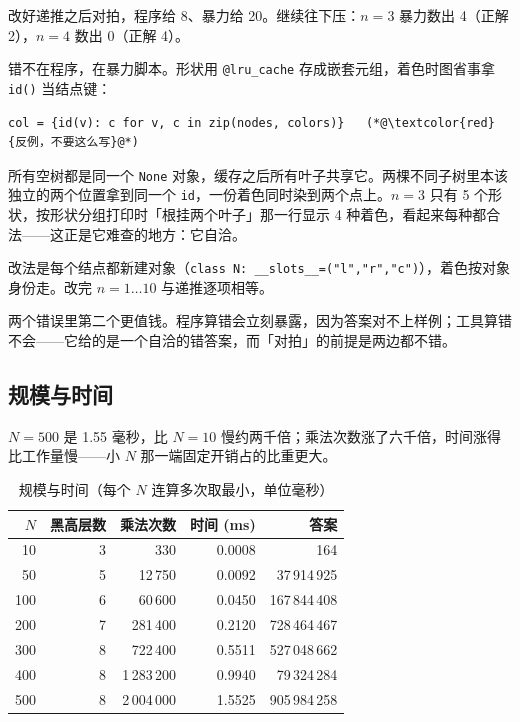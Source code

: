 \documentclass[12pt,a4paper,fontset=windows]{ctexart}
\newcommand{\code}[1]{\texttt{#1}}
\begin{document}
改好递推之后对拍，程序给 8、暴力给 20。继续往下压：$n=3$ 暴力数出 4（正解 2），$n=4$ 数出 0（正解 4）。

错不在程序，在暴力脚本。形状用 \code{@lru\_cache} 存成嵌套元组，着色时图省事拿 \code{id()} 当结点键：
\begin{lstlisting}
col = {id(v): c for v, c in zip(nodes, colors)}   (*@\textcolor{red}{反例，不要这么写}@*)
\end{lstlisting}
所有空树都是同一个 \code{None} 对象，缓存之后所有叶子共享它。两棵不同子树里本该独立的两个位置拿到同一个 \code{id}，一份着色同时染到两个点上。$n=3$ 只有 5 个形状，按形状分组打印时「根挂两个叶子」那一行显示 4 种着色，看起来每种都合法——这正是它难查的地方：它自洽。

改法是每个结点都新建对象（\code{class N: \_\_slots\_\_=("l","r","c")}），着色按对象身份走。改完 $n=1\ldots 10$ 与递推逐项相等。

两个错误里第二个更值钱。程序算错会立刻暴露，因为答案对不上样例；工具算错不会——它给的是一个自洽的错答案，而「对拍」的前提是两边都不错。

\subsection{规模与时间}

$N=500$ 是 1.55 毫秒，比 $N=10$ 慢约两千倍；乘法次数涨了六千倍，时间涨得比工作量慢——小 $N$ 那一端固定开销占的比重更大。

\begin{table}[htbp]
\centering
\caption{规模与时间（每个 $N$ 连算多次取最小，单位毫秒）}
\small
\begin{tabular}{rrrrr}
\toprule
\rowcolor{gray!12}$N$ & 黑高层数 & 乘法次数 & 时间 (ms) & 答案 \\
\midrule
10 & 3 & 330 & 0.0008 & 164 \\
50 & 5 & 12\,750 & 0.0092 & 37\,914\,925 \\
100 & 6 & 60\,600 & 0.0450 & 167\,844\,408 \\
200 & 7 & 281\,400 & 0.2120 & 728\,464\,467 \\
300 & 8 & 722\,400 & 0.5511 & 527\,048\,662 \\
400 & 8 & 1\,283\,200 & 0.9940 & 79\,324\,284 \\
500 & 8 & 2\,004\,000 & 1.5525 & 905\,984\,258 \\
\bottomrule
\end{tabular}
\end{table}

\end{document}
